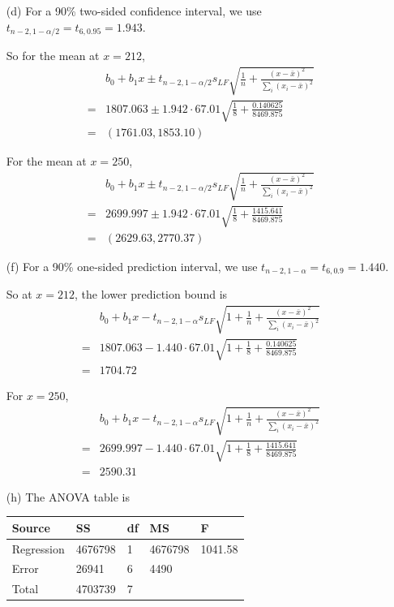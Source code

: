 \documentclass{article}\usepackage[]{graphicx}\usepackage[]{color}
\begin{document}
\begin{enumerate}
\begin{itemize}
  \item[(d)]
  For a 90\% two-sided confidence interval, we use $t_{n-2, 1 - \alpha/2} = t_{6, 0.95} = 1.943$. 
  
  So for the mean at $x = 212$, 
  \begin{align*}
  & b_0 + b_1 x \pm t_{n-2, 1 - \alpha/2} s_{LF} \sqrt{\frac{1}{n} + \frac{(x - \bar{x})^2}{\sum_{i} (x_i - \bar{x})^2}}\\
  = & 1807.063 \pm 1.942 \cdot 67.01 \sqrt{\frac{1}{8} + \frac{0.140625}{8469.875}}\\
  =& (1761.03, 1853.10)
  \end{align*}
  
  For the mean at $x = 250$, 
  \begin{align*}
  & b_0 + b_1 x \pm t_{n-2, 1 - \alpha/2} s_{LF} \sqrt{\frac{1}{n} + \frac{(x - \bar{x})^2}{\sum_{i} (x_i - \bar{x})^2}}\\
  = & 2699.997 \pm 1.942 \cdot 67.01 \sqrt{\frac{1}{8} + \frac{1415.641}{8469.875}}\\
  =& (2629.63, 2770.37)
  \end{align*}
  
  \item[(f)]
  For a 90\% one-sided prediction interval, we use $t_{n-2, 1 - \alpha} = t_{6, 0.9} = 1.440$. 
  
  So at $x = 212$, the lower prediction bound is
  \begin{align*}
  & b_0 + b_1 x - t_{n-2, 1 - \alpha} s_{LF} \sqrt{1 + \frac{1}{n} + \frac{(x - \bar{x})^2}{\sum_{i} (x_i - \bar{x})^2}}\\
  = & 1807.063  - 1.440 \cdot 67.01 \sqrt{1 + \frac{1}{8} + \frac{0.140625}{8469.875}}\\
  = & 1704.72
  \end{align*}
  
  For $x = 250$,
  \begin{align*}
  & b_0 + b_1 x - t_{n-2, 1 - \alpha} s_{LF} \sqrt{1 + \frac{1}{n} + \frac{(x - \bar{x})^2}{\sum_{i} (x_i - \bar{x})^2}}\\
  = & 2699.997 - 1.440 \cdot 67.01 \sqrt{1 + \frac{1}{8} + \frac{1415.641}{8469.875}}\\
  =& 2590.31
  \end{align*}
  
  \item[(h)]
  The ANOVA table is
  \begin{center}
  \begin{tabular}{lllll}
  \hline 
  Source & SS & df & MS & F\\ \hline
  Regression & 4676798 & 1 & 4676798 & 1041.58\\
  Error & 26941 & 6 & 4490 & \\ \hline
  Total & 4703739 & 7 & & \\ \hline
  

\end{tabular}
\end{center}
\end{itemize}
\end{enumerate}
\end{document}
